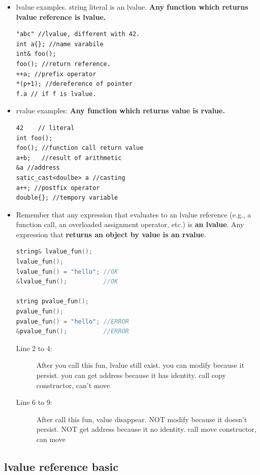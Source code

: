 \documentclass[a4paper,11pt,twoside]{book}
\begin{document}
\begin{itemize}
\item lvalue examples. string literal is an lvalue. \textbf{Any function which returns lvalue reference is lvalue.}
\begin{lstlisting}
"abc" //lvalue, different with 42.
int a{}; //name varabile 
int& foo();
foo(); //return reference.
++a; //prefix operator
*(p+1); //dereference of pointer
f.a // if f is lvalue.
\end{lstlisting}
	
	\item rvalue examples: \textbf{Any function which returns value is rvalue.}
\begin{lstlisting}
42    // literal
int foo(); 
foo(); //function call return value
a+b;   //result of arithmetic
&a //address 
satic_cast<doulbe> a //casting
a++; //postfix operator
double{}; //tempory variable
\end{lstlisting}

	\item Remember that any expression that evaluates to an lvalue reference (e.g., a function call, an overloaded assignment operator, etc.) is \textbf{an lvalue}. Any expression that \textbf{returns an object by value is an rvalue}.

\begin{lstlisting}[frame=single, language=c++, mathescape=true]
string& lvalue_fun();
lvalue_fun(); 
lvalue_fun() = "hello"; //OK
&lvalue_fun();          //OK
	
string pvalue_fun();
pvalue_fun(); 
pvalue_fun() = "hello"; //ERROR
&pvalue_fun();          //ERROR
\end{lstlisting}

\begin{description}
	\item[Line 2 to 4:] After you call this fun, lvalue still exist. you can modify because it persist. you can get address because it has identity. call copy constructor, can't move
	
	\item[Line 6 to 9:]  After call this fun, value disappear. NOT modify because it doesn't persist. NOT get address because it no identity. call move constructor, can move
\end{description}
\end{itemize}

\subsection{lvalue reference basic}
\end{document}

